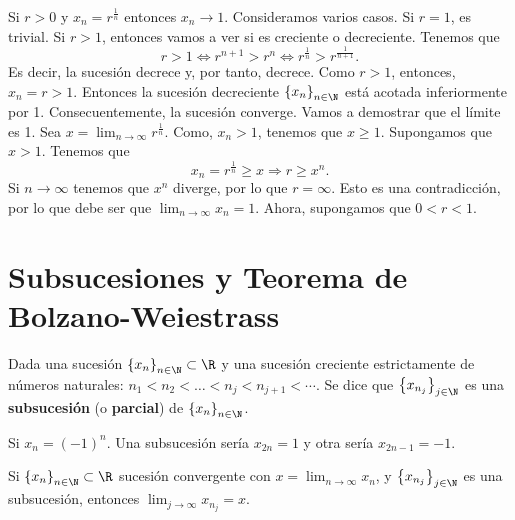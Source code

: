 \begin{eg}
\normalfont Si $\displaystyle r > 0 $ y $\displaystyle x_{n} = r^{\frac{1}{n}} $ entonces $\displaystyle x_{n}\to 1 $. Consideramos varios casos. Si $\displaystyle r = 1 $, es trivial. Si $\displaystyle r > 1 $, entonces vamos a ver si es creciente o decreciente. Tenemos que
\[ r > 1 \iff r^{n+1} > r^{n} \iff r^{\frac{1}{n}} > r^{\frac{1}{n+1}} .\]
Es decir, la sucesión decrece y, por tanto, decrece. Como $\displaystyle r > 1 $, entonces, $\displaystyle x_{n} = r > 1 $. Entonces la sucesión decreciente $\displaystyle \left\{ x_{n}\right\} _{n\in\N}$ está acotada inferiormente por 1. Consecuentemente, la sucesión converge. Vamos a demostrar que el límite es 1. Sea $\displaystyle x = \lim_{n \to \infty}r^{\frac{1}{n}} $. Como, $\displaystyle x_{n} > 1 $, tenemos que $\displaystyle x \geq 1 $. Supongamos que $\displaystyle x > 1 $. Tenemos que
\[x_{n} = r^{\frac{1}{n}} \geq x \Rightarrow r \geq x^{n} .\]
Si $\displaystyle n \to \infty $ tenemos que $\displaystyle x^{n} $ diverge, por lo que $\displaystyle r  = \infty $. Esto es una contradicción, por lo que debe ser que $\displaystyle \lim_{n \to \infty}x_{n} = 1 $. Ahora, supongamos que $\displaystyle 0 < r < 1 $.
\end{eg}

\section{Subsucesiones y Teorema de Bolzano-Weiestrass}

\begin{fdefinition}[]
	\normalfont Dada una sucesión $\displaystyle \left\{ x_{n}\right\} _{n\in\N}\subset \R $ y una sucesión creciente estrictamente de números naturales: $\displaystyle n_{1} < n_{2} < \ldots < n_{j}< n_{j+1} < \cdots  $. Se dice que $\displaystyle \left\{ x_{n_{j}}\right\} _{j\in\N} $ es una \textbf{subsucesión} (o \textbf{parcial}) de $\displaystyle \left\{ x_{n}\right\} _{n\in\N} $.
\end{fdefinition}

\begin{eg}
\normalfont Si $\displaystyle x_{n} = \left(-1\right)^{n} $. Una subsucesión sería $\displaystyle x_{2n} = 1 $ y otra sería $\displaystyle x_{2n -1} = -1 $.
\end{eg}

\begin{ftheorem}[]
	\normalfont Si $\displaystyle \left\{ x_{n}\right\} _{n\in\N}\subset\R $ sucesión convergente con $\displaystyle x = \lim_{n \to \infty}x_{n} $, y $\displaystyle \left\{ x_{n_{j}}\right\}_{j\in\N}  $ es una subsucesión, entonces $\displaystyle \lim_{j \to \infty}x_{n_{j}} = x $. 
\end{ftheorem}

